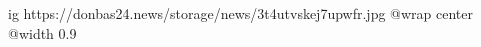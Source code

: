  
 
 
 
 

\ifcmt
  ig https://donbas24.news/storage/news/3t4utvskej7upwfr.jpg
  @wrap center
  @width 0.9
\fi
